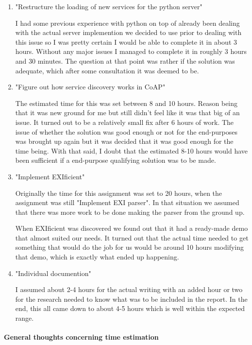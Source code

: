 \begin{enumerate}
\item{"Restructure the loading of new services for the python server"}

I had some previous experience with python on top of already been dealing with the actual server implemention we decided to use prior to dealing with this issue so I was pretty certain I would be able to complete it in about 3 hours.
Without any major issues I managed to complete it in roughly 3 hours and 30 minutes. The question at that point was rather if the solution was adequate, which after some consultation it was deemed to be.

\item {"Figure out how service discovery works in CoAP"}

The estimated time for this was set between 8 and 10 hours. Reason being that it was new ground for me but still didn't feel like it was that big of
an issue. It turned out to be a relatively small fix after 6 hours of work. The issue of whether the solution was good enough or not for the end-purposes was brought up again but it was decided that it was good enough for the time being.
With that said, I doubt that the estimated 8-10 hours would have been sufficient if a end-purpose qualifying solution was to be made. 

\item {"Implement EXIficient"}

Originally the time for this assignment was set to 20 hours, when the assignment was still "Implement EXI parser". In that situation we assumed that there was more work to be done making the parser from the ground up.

When EXIficient was discovered we found out that it had a ready-made demo that almost suited our needs. It turned out that the actual time needed to get something that would do the job for us would be around 10 hours modifying that demo, which is exactly what ended up happening.

\item {"Individual documention"}

I assumed about 2-4 hours for the actual writing with an added hour or two for the research needed to know what was to be included in the report. In the end, this all came down to about 4-5 hours which is well within the expected range.

\end{enumerate}

\paragraph{General thoughts concerning time estimation}

